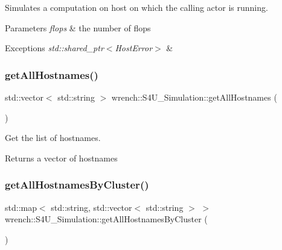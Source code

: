 Simulates a computation on host on which the calling actor is running. 


\begin{DoxyParams}{Parameters}
{\em flops} & the number of flops \\
\hline
\end{DoxyParams}

\begin{DoxyExceptions}{Exceptions}
{\em std\+::shared\+\_\+ptr$<$\+Host\+Error$>$} & \\
\hline
\end{DoxyExceptions}
\mbox{\label{classwrench_1_1_s4_u___simulation_a72770be3bff81efae817e322b8b228d6}} 
\subsubsection{\texorpdfstring{get\+All\+Hostnames()}{getAllHostnames()}}
{\footnotesize\ttfamily std\+::vector$<$ std\+::string $>$ wrench\+::\+S4\+U\+\_\+\+Simulation\+::get\+All\+Hostnames (\begin{DoxyParamCaption}{ }\end{DoxyParamCaption})}



Get the list of hostnames. 

\begin{DoxyReturn}{Returns}
a vector of hostnames 
\end{DoxyReturn}
\mbox{\label{classwrench_1_1_s4_u___simulation_a9f45613070010a4d280b1a37af4c5061}} 
\subsubsection{\texorpdfstring{get\+All\+Hostnames\+By\+Cluster()}{getAllHostnamesByCluster()}}
{\footnotesize\ttfamily std\+::map$<$ std\+::string, std\+::vector$<$ std\+::string $>$ $>$ wrench\+::\+S4\+U\+\_\+\+Simulation\+::get\+All\+Hostnames\+By\+Cluster (\begin{DoxyParamCaption}{ }\end{DoxyParamCaption})\hspace{0.3cm}{\ttfamily [static]}}



